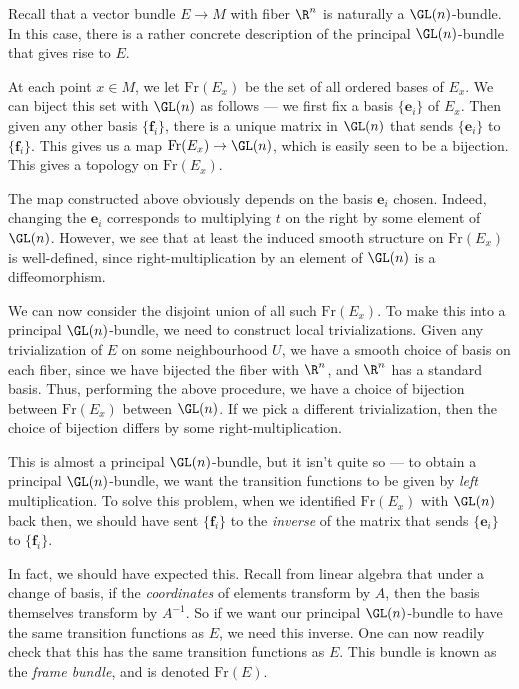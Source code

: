 \documentclass[a4paper]{article}
\begin{document}
\begin{eg}
  Recall that a vector bundle $E \to M$ with fiber $\R^n$ is naturally a $\GL(n)$-bundle. In this case, there is a rather concrete description of the principal $\GL(n)$-bundle that gives rise to $E$.

  At each point $x \in M$, we let $\mathrm{Fr}(E_x)$ be the set of all ordered bases of $E_x$. We can biject this set with $\GL(n)$ as follows --- we first fix a basis $\{\mathbf{e}_i\}$ of $E_x$. Then given any other basis $\{\mathbf{f}_i\}$, there is a unique matrix in $\GL(n)$ that sends $\{\mathbf{e}_i\}$ to $\{\mathbf{f}_i\}$. This gives us a map $\mathrm{Fr}(E_x) \to \GL(n)$, which is easily seen to be a bijection. This gives a topology on $\mathrm{Fr}(E_x)$.

  The map constructed above obviously depends on the basis $\mathbf{e}_i$ chosen. Indeed, changing the $\mathbf{e}_i$ corresponds to multiplying $t$ on the right by some element of $\GL(n)$. However, we see that at least the induced smooth structure on $\mathrm{Fr}(E_x)$ is well-defined, since right-multiplication by an element of $\GL(n)$ is a diffeomorphism.

  We can now consider the disjoint union of all such $\mathrm{Fr}(E_x)$. To make this into a principal $\GL(n)$-bundle, we need to construct local trivializations. Given any trivialization of $E$ on some neighbourhood $U$, we have a smooth choice of basis on each fiber, since we have bijected the fiber with $\R^n$, and $\R^n$ has a standard basis. Thus, performing the above procedure, we have a choice of bijection between $\mathrm{Fr}(E_x)$ between $\GL(n)$. If we pick a different trivialization, then the choice of bijection differs by some right-multiplication.

  This is almost a principal $\GL(n)$-bundle, but it isn't quite so --- to obtain a principal $\GL(n)$-bundle, we want the transition functions to be given by \emph{left} multiplication. To solve this problem, when we identified $\mathrm{Fr}(E_x)$ with $\GL(n)$ back then, we should have sent $\{\mathbf{f}_i\}$ to the \emph{inverse} of the matrix that sends $\{\mathbf{e}_i\}$ to $\{\mathbf{f}_i\}$.

  In fact, we should have expected this. Recall from linear algebra that under a change of basis, if the \emph{coordinates} of elements transform by $A$, then the basis themselves transform by $A^{-1}$. So if we want our principal $\GL(n)$-bundle to have the same transition functions as $E$, we need this inverse. One can now readily check that this has the same transition functions as $E$. This bundle is known as the \emph{frame bundle}, and is denoted $\mathrm{Fr}(E)$.


\end{eg}
\end{document}
